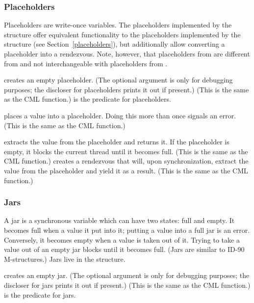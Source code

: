 \subsubsection{Placeholders}
%
Placeholders are write-once variables.  The placeholders implemented
by the  structure offer equivalent
functionality to the placeholders implemented by the
 structure (see Section~\ref{placeholders}), but
additionally allow converting a placeholder into a rendezvous.  Note,
however, that placeholders from  are different from
and not interchangeable with placeholders from
.
%
\begin{protos}
\end{protos}
%
 creates an empty placeholder.  (The optional
 argument is only for debugging purposes; the discloser for
placeholders prints it out if present.)  (This is the same as the CML
 function.)   is the predicate for
placeholders.
%
\begin{protos}
\end{protos}
%
 places a value into a placeholder.  Doing this
more than once signals an error.  (This is the same as the CML
 function.)
%
\begin{protos}
\end{protos}
%
 extracts the value from the placeholder and
returns it.  If the placeholder is empty, it blocks the current thread
until it becomes full.  (This is the same as the CML 
function.)   creates a rendezvous that
will, upon synchronization, extract the value from the placeholder
and yield it as a result.  (This is the same as the CML 
function.)

\subsubsection{Jars}

A jar is a synchronous variable which can have two states: full and
empty.  It becomes full when a value it put into it; putting a value
into a full jar is an error.  Conversely, it becomes empty when a
value is taken out of it.  Trying to take a value out of an empty jar
blocks until it becomes full.  (Jars are similar to ID-90
M-structures.)  Jars live in the  structure.
%
\begin{protos}
\end{protos}
%
 creates an empty jar.  (The optional 
argument is only for debugging purposes; the discloser for jars prints
it out if present.)  (This is the same as the CML 
function.)   is the predicate for jars.

